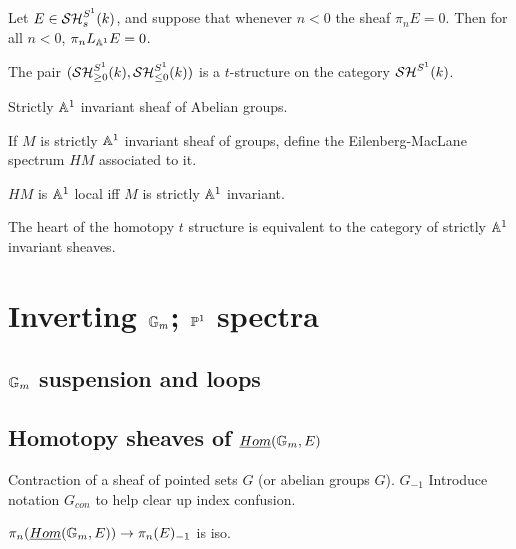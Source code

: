 \documentclass{amsart}%
\begin{document}
\begin{theorem}
  Let $E \in \mathcal{SH}_s^{S^1}(k)$, and suppose that whenever $n < 0$ the
  sheaf $\pi_n E = 0$. Then for all $n<0$, $\pi_n L_{\mathbb{A}^1}E = 0$.
\end{theorem}

\begin{theorem}
  The pair $(\mathcal{SH}_{\geq 0}^{S^1}(k), \mathcal{SH}_{\leq 0}^{S^1}(k))$ is a
  $t$-structure on the category $\mathcal{SH}^{S^1}(k)$. 
\end{theorem}

\begin{definition}
  Strictly $\mathbb{A}^1$ invariant sheaf of Abelian groups.

  If $M$ is strictly $\mathbb{A}^1$ invariant sheaf of groups, define the
  Eilenberg-MacLane spectrum $HM$ associated to it. 
\end{definition}

\begin{proposition}
  $HM$ is $\mathbb{A}^1$ local iff $M$ is strictly $\mathbb{A}^1$ invariant.
\end{proposition}

\begin{proposition}
  The heart of the homotopy $t$ structure is equivalent to the
  category of strictly $\mathbb{A}^1$ invariant sheaves. 
\end{proposition}



\section{Inverting $\mathbb{G}_m$; $\mathbb{P}^1$ spectra}

\subsection{$\mathbb{G}_m$ suspension and loops}

\subsection{Homotopy sheaves of $\underline{Hom}(\mathbb{G}_m, E)$}

\begin{definition}
  Contraction of a sheaf of pointed sets $G$ (or abelian groups
  $G$). $G_{-1}$ Introduce notation $G_{con}$ to help clear up
  index confusion. 
\end{definition}

\begin{theorem}\cite[Lemma 4.3.11]{Mor03}
  $\pi_n(\underline{Hom}(\mathbb{G}_m, E)) \to \pi_{n}(E)_{-1}$ is iso. 
\end{theorem}
\end{document}
